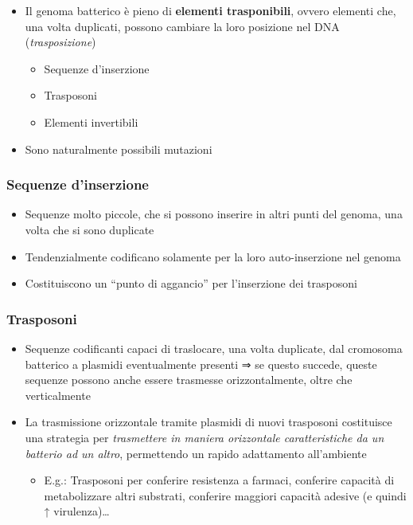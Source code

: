 \documentclass[italian,]{article}
\providecommand{\tightlist}{%
  \setlength{\itemsep}{0pt}\setlength{\parskip}{0pt}}
\begin{document}
\begin{itemize}
\tightlist
\item
  Il genoma batterico è pieno di \textbf{elementi trasponibili}, ovvero
  elementi che, una volta duplicati, possono cambiare la loro posizione
  nel DNA (\emph{trasposizione})

  \begin{itemize}
  \tightlist
  \item
    Sequenze d'inserzione
  \item
    Trasposoni
  \item
    Elementi invertibili
  \end{itemize}
\item
  Sono naturalmente possibili mutazioni
\end{itemize}

\hypertarget{sequenze-dinserzione}{%
\subsubsection{Sequenze d'inserzione}\label{sequenze-dinserzione}}

\begin{itemize}
\tightlist
\item
  Sequenze molto piccole, che si possono inserire in altri punti del
  genoma, una volta che si sono duplicate
\item
  Tendenzialmente codificano solamente per la loro auto-inserzione nel
  genoma
\item
  Costituiscono un ``punto di aggancio'' per l'inserzione dei trasposoni
\end{itemize}

\hypertarget{trasposoni}{%
\subsubsection{Trasposoni}\label{trasposoni}}

\begin{itemize}
\tightlist
\item
  Sequenze codificanti capaci di traslocare, una volta duplicate, dal
  cromosoma batterico a plasmidi eventualmente presenti ⇒ se questo
  succede, queste sequenze possono anche essere trasmesse
  orizzontalmente, oltre che verticalmente
\item
  La trasmissione orizzontale tramite plasmidi di nuovi trasposoni
  costituisce una strategia per \emph{trasmettere in maniera orizzontale
  caratteristiche da un batterio ad un altro}, permettendo un rapido
  adattamento all'ambiente

  \begin{itemize}
  \tightlist
  \item
    E.g.: Trasposoni per conferire resistenza a farmaci, conferire
    capacità di metabolizzare altri substrati, conferire maggiori
    capacità adesive (e quindi ↑ virulenza)\ldots{}
  \end{itemize}
\end{itemize}
\end{document}
